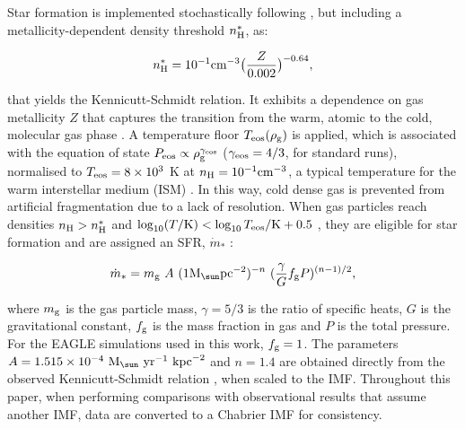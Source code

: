 \documentclass[useAMS,usenatbib]{mn2e}
\begin{document}
Star formation is implemented stochastically following 
\citet{schaye2008},
but including a metallicity-dependent density threshold $n_{\rm H}^*$, as:

\begin{equation}
n_{\rm H}^* = 10^{-1} {\rm cm}^{-3} \big(\frac{Z}{0.002}\big)^{-0.64}, 
\end{equation}

\noindent
that yields the Kennicutt-Schmidt relation.
It exhibits a dependence on gas metallicity $Z$ that captures the transition
from the warm, atomic to the cold, molecular gas phase \citep{schaye2004}. 
A temperature floor 
$T_{\rm eos} ( {\rho}_{\rm g} )$ is applied, which is associated with the equation of state
$P_{\rm eos} \propto {\rho}_{\rm g}^{{\gamma}_{\rm eos}}$ 
(${\gamma}_{\rm eos} = 4/3$, for standard runs), normalised to $T_{\rm eos} = 8 \times 10^3$ K
at $n_{\rm H} = 10^{-1} {\rm cm}^{-3}$, a typical temperature for the warm interstellar medium (ISM) 
\citep[e.g.][]{richings2014}. In this way, cold dense gas is prevented from artificial
fragmentation due to a lack of resolution.
When gas particles reach densities $n_{\rm H} > n_{\rm H}^*$ and 
$\log_{10} (T/{\rm K}) < \log_{10} T_{\rm eos}/{\rm K} + 0.5$ , they are eligible for
star formation and are assigned an SFR, ${\dot m}_*$ \citep{schaye2008}:

\begin{equation}
\label{eq:sfr}
{\dot m}_* = m_{\rm g} \ A \ (1 {\rm M}_{\sun} {\rm pc}^{-2})^{-n} \ (\frac{\gamma}{G} 
             f_{\rm g} P)^{(n-1)/2} ,
\end{equation}

\noindent
where $m_{\rm g}$ is the gas particle mass, $\gamma = 5/3$ is the ratio of specific
heats, $G$ is the gravitational constant, $f_{\rm g}$ is the mass fraction in gas 
and $P$ is the total pressure.  For the {\sc EAGLE} simulations used in this work, 
$f_{\rm g} = 1$. The parameters $A= 1.515 \times 10^{-4} \ {\rm M}_{\sun} \ {\rm yr}^{-1} \ {\rm kpc}^{-2}$ 
and $n=1.4$ are obtained directly from 
the observed Kennicutt-Schmidt relation \citep{kennicutt1998}, when scaled
to the \citet{chabrier2003} IMF.
Throughout this paper, when performing comparisons with observational results 
that assume another IMF, 
data are converted to a Chabrier IMF for consistency.
\end{document}
